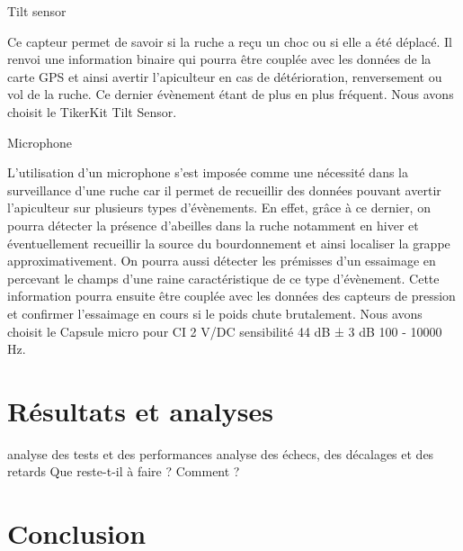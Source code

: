 Tilt sensor 

Ce capteur permet de savoir si la ruche a reçu un choc ou si elle a été déplacé. Il renvoi une information binaire qui pourra être couplée avec les données de la carte GPS et ainsi avertir l'apiculteur en cas de détérioration, renversement ou vol de la ruche. Ce dernier évènement étant de plus en plus fréquent.
Nous avons choisit le TikerKit Tilt Sensor. 

Microphone

L'utilisation d'un microphone s'est imposée comme une nécessité dans la surveillance d'une ruche car il permet de recueillir des données pouvant avertir l'apiculteur sur plusieurs types d'évènements. En effet, grâce à ce dernier, on pourra détecter la présence d'abeilles dans la ruche notamment en hiver et éventuellement recueillir la source du bourdonnement et ainsi localiser la grappe approximativement. On pourra aussi détecter les prémisses d'un essaimage en percevant le champs d'une raine caractéristique de ce type d'évènement. Cette information pourra ensuite être couplée avec les données des capteurs de pression et confirmer l'essaimage en cours si le poids chute brutalement. 
Nous avons choisit le Capsule micro pour CI 2 V/DC sensibilité 44 dB ± 3 dB 100 - 10000 Hz. 

\chapter{Résultats et analyses}

analyse des tests et des performances
analyse des échecs, des décalages et des retards
Que reste-t-il à faire ? Comment ?


\chapter{Conclusion}
